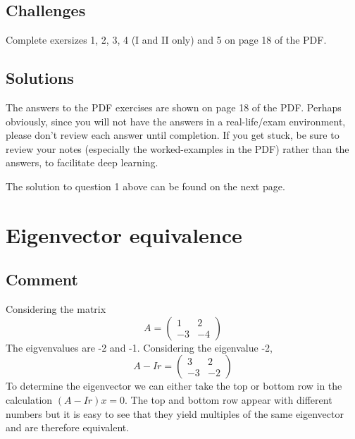 \subsection*{Challenges}
Complete exersizes 1, 2, 3, 4 (I and II only) and 5 on page 18 of the PDF.

\subsection*{Solutions}
The answers to the PDF exercises are shown on page 18 of the PDF. Perhaps obviously, since you will not have the answers in a real-life/exam environment, please don't review each answer until completion. If you get stuck, be sure to review your notes (especially the worked-examples in the PDF) rather than the answers, to facilitate deep learning. 

The solution to question 1 above can be found on the next page.




\newpage
\section{Eigenvector equivalence}

\subsection*{Comment}
Considering the matrix
\begin{equation}
    A = \left(
        \begin{array}{cc}
            1 & 2 \\
            -3 & -4
        \end{array}
    \right)
\end{equation}
The eigvenvalues are -2 and -1. Considering the eigenvalue -2, 
\begin{equation}
    A - Ir = \left(
        \begin{array}{cc}
            3 & 2 \\
            -3 & -2
        \end{array}
    \right)
\end{equation}
To determine the eigenvector we can either take the top or bottom row in the calculation $(A - Ir)x = 0$.
The top and bottom row appear with different numbers but it is easy to see that they yield multiples of the same eigenvector and are therefore equivalent.

